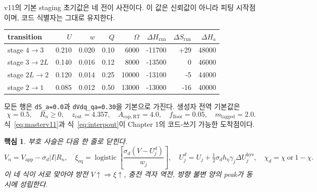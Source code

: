 \documentclass[11pt,a4paper]{article}
\newtheorem*{keybox}{핵심}
\newcommand{\eq}{\mathrm{eq}}
\newcommand{\app}{\mathrm{app}}
\newcommand{\hys}{\mathrm{hys}}
\newcommand{\lag}{\mathrm{lagged}}
\begin{document}
v11의 기본 staging 초기값은 네 전이 사전이다. 이 값은 신뢰값이 아니라 피팅 시작점이며, 코드 식별자는 그대로 유지한다.
\begin{center}
\renewcommand{\arraystretch}{1.22}
\begin{tabular}{lrrrrrrr}
\toprule
transition & $U$ & $w$ & $Q$ & $\Omega$ & $\Delta H_{\mathrm{rxn}}$ & $\Delta S_{\mathrm{rxn}}$ & $\Delta H_a$\\
\midrule
stage $4\to3$ & 0.210 & 0.020 & 0.10 & 6000 & -11700 & +29 & 48000\\
stage $3\to2L$ & 0.140 & 0.016 & 0.12 & 8000 & -13500 & 0 & 46000\\
stage $2L\to2$ & 0.120 & 0.014 & 0.25 & 10000 & -13100 & -5 & 44000\\
stage $2\to1$ & 0.085 & 0.012 & 0.50 & 13000 & -13000 & -16 & 40000\\
\bottomrule
\end{tabular}
\end{center}
모든 행은 \texttt{dS\_a=0.0}과 \texttt{dVdq\_qa=0.30}을 기본으로 가진다. 생성자 전역 기본값은
\begin{equation}
\chi=0.5,\quad R_n\ge0,\quad
z_{\mathrm{cut}}=4.357,\quad A_{\mathrm{cap,RT}}=4.0,\quad
f_{\mathrm{floor}}=0.05,\quad
m_{\lag}=2.0.
\label{eq:defaults}
\end{equation}
식~\eqref{eq:masterv11}과 식~\eqref{eq:interpout}이 Chapter 1의 코드-쓰기 가능한 도착점이다.

\begin{keybox}
부호 사슬은 다음 한 줄로 닫힌다.
\[
V_n=V_{\app}-\sigma_d|I|R_n,\quad
\xi_{\eq}=\operatorname{logistic}\!\left[\frac{\sigma_d(V-U_j^d)}{w_j}\right],\quad
U_j^d=U_j+\tfrac12\sigma_d h_\eta\gamma_j\Delta U_j^{\hys},\quad
\chi_d=\chi\ \text{or}\ 1-\chi.
\]
이 네 식이 서로 맞아야 방전 $V\uparrow\Rightarrow\xi\uparrow$, 충전 격자 역전, 방향 불변 양의 peak가 동시에 성립한다.
\end{keybox}
\end{document}
